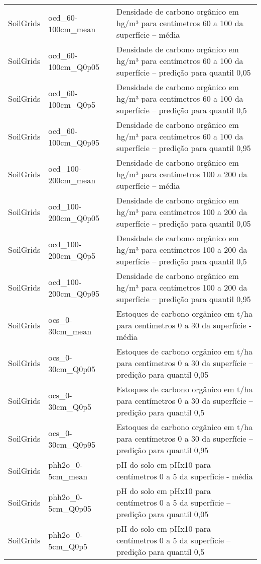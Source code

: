 \begin{longtable}{@{} p{4cm} p{4cm} p{8cm} @{}}
	SoilGrids &
	ocd\_60-100cm\_mean &
	Densidade de carbono orgânico em hg/m³ para centímetros 60 a 100 da superfície – média \\
	SoilGrids &
	ocd\_60-100cm\_Q0p05 &
	Densidade de carbono orgânico em hg/m³ para centímetros 60 a 100 da superfície – predição para quantil 0,05 \\
	SoilGrids &
	ocd\_60-100cm\_Q0p5 &
	Densidade de carbono orgânico em hg/m³ para centímetros 60 a 100 da superfície – predição para quantil 0,5 \\
	SoilGrids &
	ocd\_60-100cm\_Q0p95 &
	Densidade de carbono orgânico em hg/m³ para centímetros 60 a 100 da superfície – predição para quantil 0,95 \\
	SoilGrids &
	ocd\_100-200cm\_mean &
	Densidade de carbono orgânico em hg/m³ para centímetros 100 a 200 da superfície – média \\
	SoilGrids &
	ocd\_100-200cm\_Q0p05 &
	Densidade de carbono orgânico em hg/m³ para centímetros 100 a 200 da superfície – predição para quantil 0,05 \\
	SoilGrids &
	ocd\_100-200cm\_Q0p5 &
	Densidade de carbono orgânico em hg/m³ para centímetros 100 a 200 da superfície – predição para quantil 0,5 \\
	SoilGrids &
	ocd\_100-200cm\_Q0p95 &
	Densidade de carbono orgânico em hg/m³ para centímetros 100 a 200 da superfície – predição para quantil 0,95 \\
	SoilGrids &
	ocs\_0-30cm\_mean &
	Estoques de carbono orgânico em t/ha para centímetros 0 a 30 da superfície - média \\
	SoilGrids &
	ocs\_0-30cm\_Q0p05 &
	Estoques de carbono orgânico em t/ha para centímetros 0 a 30 da superfície – predição para quantil 0,05 \\
	SoilGrids &
	ocs\_0-30cm\_Q0p5 &
	Estoques de carbono orgânico em t/ha para centímetros 0 a 30 da superfície – predição para quantil 0,5 \\
	SoilGrids &
	ocs\_0-30cm\_Q0p95 &
	Estoques de carbono orgânico em t/ha para centímetros 0 a 30 da superfície – predição para quantil 0,95 \\
	SoilGrids &
	phh2o\_0-5cm\_mean &
	pH do solo em pHx10 para centímetros 0 a 5 da superfície - média \\
	SoilGrids &
	phh2o\_0-5cm\_Q0p05 &
	pH do solo em pHx10 para centímetros 0 a 5 da superfície – predição para quantil 0,05 \\
	SoilGrids &
	phh2o\_0-5cm\_Q0p5 &
	pH do solo em pHx10 para centímetros 0 a 5 da superfície – predição para quantil 0,5 \\

\end{longtable}

